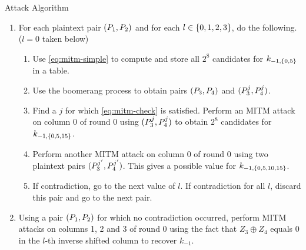 \documentclass[notheorems]{beamer}
\theoremstyle{definition}
\theoremstyle{example}
\begin{document}
    \begin{frame}[<+->]{Attack Algorithm}
        \begin{enumerate}
            \conti
            \item For each plaintext pair \((P_1, P_2)\) and for each \(l
            \in \{0, 1, 2, 3\}\), do the following. (\(l = 0\) taken below)
            \begin{enumerate}[<+->]
                \item Use \eqref{eq:mitm-simple} to compute and store all
                \(2^8\) candidates for \(k_{-1, \{0, 5\}}\) in a table.
                \item Use the boomerang process to obtain pairs \((P_3,
                P_4)\) and \((P_3^j, P_4^j)\).
                \item Find a \(j\) for which \eqref{eq:mitm-check} is satisfied.
                Perform an MITM attack on column 0 of round 0 using
                \((P_3^j, P_4^j)\) to obtain \(2^8\) candidates for
                \(k_{-1, \{0, 5, 15\}}\).
                \item Perform another MITM attack on column 0 of round 0 using
                two plaintext pairs \((P_3^{j^\prime}, P_4^{j^\prime})\).
                This gives a possible value for \(k_{-1, \{0, 5, 10,
                15\}}\).
                \item If contradiction, go to the next value of \(l\). If
                contradiction for all \(l\), discard this pair and go to the
                next pair.
            \end{enumerate}
            \item Using a pair \((P_1, P_2)\) for which no contradiction
            occurred, perform MITM attacks on columns 1, 2 and 3 of round 0
            using the fact that \(Z_3 \oplus Z_4\) equals 0 in the \(l\)-th
            inverse shifted column to recover \(k_{-1}\). 
        \end{enumerate}
    \end{frame}
\end{document}
